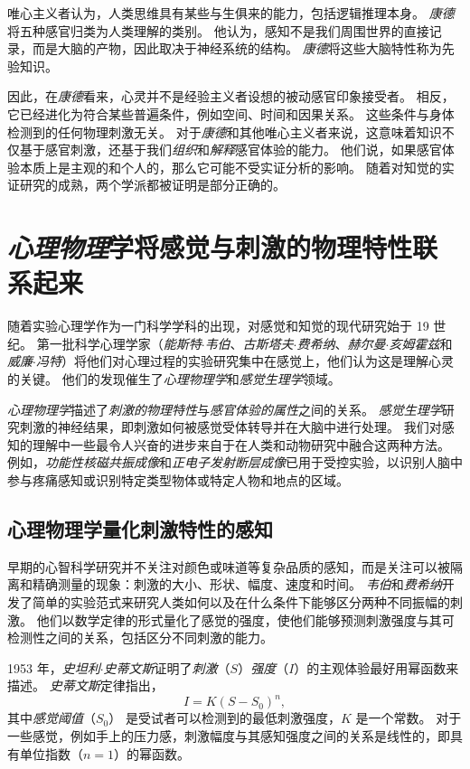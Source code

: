 唯心主义者认为，人类思维具有某些与生俱来的能力，包括逻辑推理本身。
\textit{康德}将五种感官归类为人类理解的类别。
他认为，感知不是我们周围世界的直接记录，而是大脑的产物，因此取决于神经系统的结构。
\textit{康德}将这些大脑特性称为先验知识。


因此，在\textit{康德}看来，心灵并不是经验主义者设想的被动感官印象接受者。
相反，它已经进化为符合某些普遍条件，例如空间、时间和因果关系。
这些条件与身体检测到的任何物理刺激无关。 
对于\textit{康德}和其他唯心主义者来说，这意味着知识不仅基于感官刺激，还基于我们\textit{组织}和\textit{解释}感官体验的能力。
他们说，如果感官体验本质上是主观的和个人的，那么它可能不受实证分析的影响。
随着对知觉的实证研究的成熟，两个学派都被证明是部分正确的。



\section{\textit{心理物理}学将感觉与刺激的物理特性联系起来}

随着实验心理学作为一门科学学科的出现，对感觉和知觉的现代研究始于 19 世纪。
第一批科学心理学家（\textit{能斯特$\cdot$韦伯}、\textit{古斯塔夫$\cdot$费希纳}、\textit{赫尔曼$\cdot$亥姆霍兹}和\textit{威廉$\cdot$冯特}）将他们对心理过程的实验研究集中在感觉上，他们认为这是理解心灵的关键。
他们的发现催生了\textit{心理物理学}和\textit{感觉生理学}领域。


\textit{心理物理学}描述了\textit{刺激的物理特性}与\textit{感官体验的属性}之间的关系。 
\textit{感觉生理学}研究刺激的神经结果，即刺激如何被感觉受体转导并在大脑中进行处理。
我们对感知的理解中一些最令人兴奋的进步来自于在人类和动物研究中融合这两种方法。
例如，\textit{功能性核磁共振成像}和\textit{正电子发射断层成像}已用于受控实验，以识别人脑中参与疼痛感知或识别特定类型物体或特定人物和地点的区域。


\subsection{心理物理学量化刺激特性的感知}

早期的心智科学研究并不关注对颜色或味道等复杂品质的感知，而是关注可以被隔离和精确测量的现象：刺激的大小、形状、幅度、速度和时间。
\textit{韦伯}和\textit{费希纳}开发了简单的实验范式来研究人类如何以及在什么条件下能够区分两种不同振幅的刺激。
他们以数学定律的形式量化了感觉的强度，使他们能够预测刺激强度与其可检测性之间的关系，包括区分不同刺激的能力。


1953 年，\textit{史坦利$\cdot$史蒂文斯}证明了\textit{刺激}（$ S $）\textit{强度}（$ I $）的主观体验最好用幂函数来描述。 
\textit{史蒂文斯}定律指出，
\begin{equation}
	I = K(S-S_0)^n,
\end{equation}
其中\textit{感觉阈值}（$ S_0 $） 是受试者可以检测到的最低刺激强度，$K$ 是一个常数。 
对于一些感觉，例如手上的压力感，刺激幅度与其感知强度之间的关系是线性的，即具有单位指数（$ n = 1 $）的幂函数。


